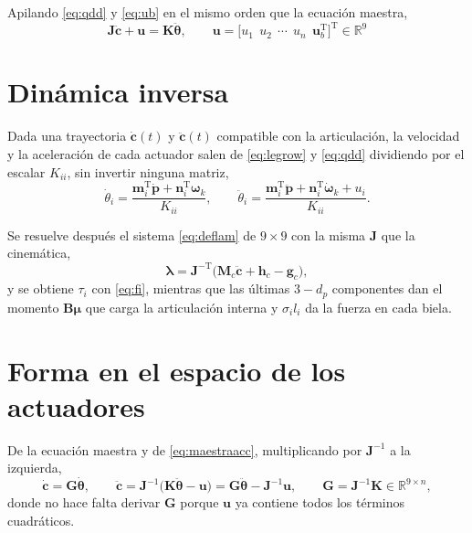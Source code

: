 \documentclass[11pt]{article}
\newcommand{\T}{^{\mathrm{T}}}
\newcommand{\pvec}{\mathbf{p}}
\newcommand{\wv}{\boldsymbol{\omega}}
\newcommand{\lam}{\boldsymbol{\lambda}}
\newcommand{\muv}{\boldsymbol{\mu}}
\newcommand{\cd}{\dot{\mathbf{c}}}
\newcommand{\cdd}{\ddot{\mathbf{c}}}
\newcommand{\thv}{\boldsymbol{\theta}}
\begin{document}
Apilando \eqref{eq:qdd} y \eqref{eq:ub} en el mismo orden que la ecuación maestra,
\begin{equation}
\boxed{\ \mathbf{J}\cdd+\mathbf{u}=\mathbf{K}\ddot{\thv},
\qquad
\mathbf{u}=\big[u_1\ \ u_2\ \ \cdots\ \ u_n\ \ \mathbf{u}_b\T\big]\T\in\mathbb{R}^9\ }
\label{eq:maestraacc}
\end{equation}

\section{Dinámica inversa}

Dada una trayectoria $\cd(t)$ y $\cdd(t)$ compatible con la articulación, la velocidad y la aceleración de cada actuador salen de \eqref{eq:legrow} y \eqref{eq:qdd} dividiendo por el escalar $K_{ii}$, sin invertir ninguna matriz,
\begin{equation}
\dot\theta_i=\frac{\mathbf{m}_i\T\dot{\pvec}+\mathbf{n}_i\T\wv_k}{K_{ii}},
\qquad
\ddot\theta_i=\frac{\mathbf{m}_i\T\ddot{\pvec}+\mathbf{n}_i\T\dot{\wv}_k+u_i}{K_{ii}} .
\label{eq:qinv}
\end{equation}

Se resuelve después el sistema \eqref{eq:deflam} de $9\times9$ con la misma $\mathbf{J}$ que la cinemática,
\begin{equation}
\lam=\mathbf{J}^{-\mathrm{T}}\big(\mathbf{M}_c\cdd+\mathbf{h}_c-\mathbf{g}_c\big),
\label{eq:laminv}
\end{equation}
y se obtiene $\tau_i$ con \eqref{eq:fi}, mientras que las últimas $3-d_p$ componentes dan el momento $\mathbf{B}\muv$ que carga la articulación interna y $\sigma_il_i$ da la fuerza en cada biela.

\section{Forma en el espacio de los actuadores}

De la ecuación maestra y de \eqref{eq:maestraacc}, multiplicando por $\mathbf{J}^{-1}$ a la izquierda,
\begin{equation}
\cd=\mathbf{G}\dot{\thv},
\qquad
\cdd=\mathbf{J}^{-1}\big(\mathbf{K}\ddot{\thv}-\mathbf{u}\big)=\mathbf{G}\ddot{\thv}-\mathbf{J}^{-1}\mathbf{u},
\qquad
\mathbf{G}=\mathbf{J}^{-1}\mathbf{K}\in\mathbb{R}^{9\times n},
\label{eq:Gacc}
\end{equation}
donde no hace falta derivar $\mathbf{G}$ porque $\mathbf{u}$ ya contiene todos los términos cuadráticos.
\end{document}
